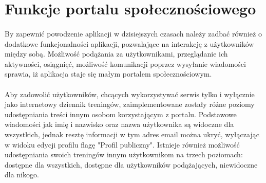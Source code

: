 \section{Funkcje portalu społecznościowego} %
\label{sec:profil_u_ytkownika}
\paragraph{} %
\label{par:}
By zapewnić powodzenie aplikacji w dzisiejszych czasach należy zadbać również o dodatkowe funkcjonalności aplikacji, pozwalające na interakcję z użytkowników między sobą. Możliwość podążania za użytkownikami, przeglądanie ich aktywności, osiągnięć, możliwość komunikacji poprzez wysyłanie wiadomości sprawia, iż aplikacja staje się małym portalem społecznościowym. 
\paragraph{} %
\label{par:}

Aby zadowolić użytkowników, chcących wykorzystywać serwis tylko i wyłącznie jako internetowy dziennik treningów, zaimplementowane zostały różne poziomy udostępniania treści innym osobom korzystającym z portalu. Podstawowe wiadomości jak imię i nazwisko oraz nazwa użytkownika są widoczne dla wszystkich, jednak resztę informacji w tym adres email można ukryć, wyłączając w widoku edycji profilu flagę "Profil publiczny". Istnieje również możliwość udostępniania swoich treningów innym użytkownikom na trzech poziomach: dostępne dla wszystkich, dostępne dla użytkowników podążających, niewidoczne dla nikogo.


